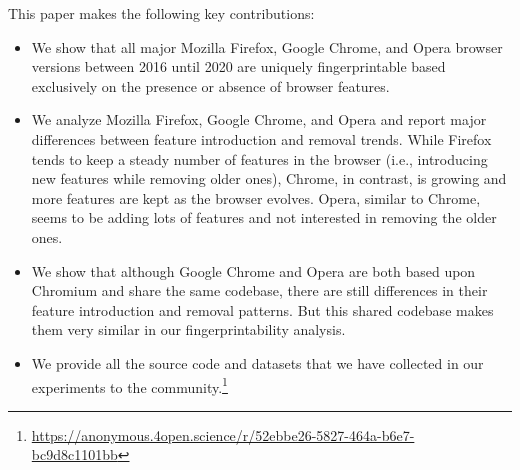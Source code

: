\noindent This paper makes the following key contributions:
%
\begin{itemize}%

\item We show that all major Mozilla Firefox, Google Chrome, and Opera browser
  versions between 2016 until 2020 are uniquely fingerprintable based exclusively on the presence or absence of browser features.

\item We analyze Mozilla Firefox, Google Chrome, and Opera and report
  major differences between feature introduction and removal
  trends. While Firefox tends to keep a steady number of features in
  the browser (i.e., introducing new features while removing older
  ones), Chrome, in contrast, is growing and more features are kept as
  the browser evolves. Opera, similar to Chrome, seems to be adding lots
  of features and not interested in removing the older ones.

\item We show that although Google Chrome and Opera are both based upon
  Chromium and share the same codebase, there are still differences in their
  feature introduction and removal patterns. But this shared codebase makes them
  very similar in our fingerprintability analysis.


\item We provide all the source code and datasets that we have collected in our experiments to the community.\footnote{\url{https://anonymous.4open.science/r/52ebbe26-5827-464a-b6e7-bc9d8c1101bb}}

\end{itemize}

